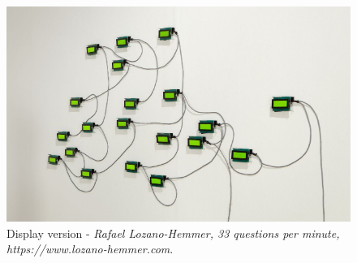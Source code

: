\begin{figure}
    \centering
    \includegraphics[width=0.8\linewidth]{assets/33_questions_per_minute_grifo.png} 
    \caption{\small Display version - \textit{Rafael Lozano-Hemmer, 33 questions per minute, https://www.lozano-hemmer.com}.}
    \label{fig:lozano}
\end{figure}

